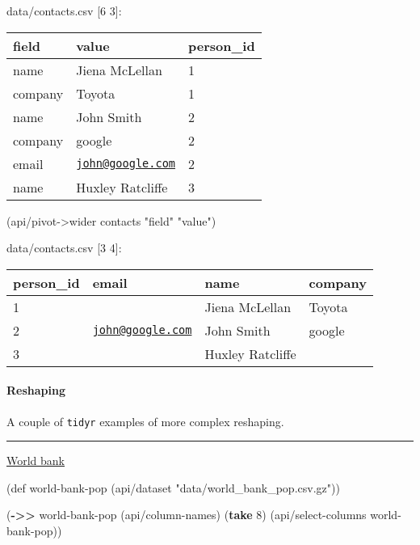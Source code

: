\documentclass[]{article}
\newenvironment{Shaded}{\begin{snugshade}}{\end{snugshade}}
\newcommand{\KeywordTok}[1]{\textcolor[rgb]{0.13,0.29,0.53}{\textbf{#1}}}
\newcommand{\DecValTok}[1]{\textcolor[rgb]{0.00,0.00,0.81}{#1}}
\newcommand{\StringTok}[1]{\textcolor[rgb]{0.31,0.60,0.02}{#1}}
\newcommand{\FunctionTok}[1]{\textcolor[rgb]{0.00,0.00,0.00}{#1}}
\newcommand{\BuiltInTok}[1]{#1}
\newcommand{\NormalTok}[1]{#1}
\let\oldparagraph\paragraph
\renewcommand{\paragraph}[1]{\oldparagraph{#1}\mbox{}}
\begin{document}
data/contacts.csv {[}6 3{]}:

\begin{longtable}[]{@{}lll@{}}
\toprule
field & value & person\_id\tabularnewline
\midrule
\endhead
name & Jiena McLellan & 1\tabularnewline
company & Toyota & 1\tabularnewline
name & John Smith & 2\tabularnewline
company & google & 2\tabularnewline
email & \href{mailto:john@google.com}{\nolinkurl{john@google.com}} &
2\tabularnewline
name & Huxley Ratcliffe & 3\tabularnewline
\bottomrule
\end{longtable}

\begin{Shaded}
\begin{Highlighting}[]
\NormalTok{(api/pivot->wider contacts }\StringTok{"field"} \StringTok{"value"}\NormalTok{)}
\end{Highlighting}
\end{Shaded}

data/contacts.csv {[}3 4{]}:

\begin{longtable}[]{@{}llll@{}}
\toprule
person\_id & email & name & company\tabularnewline
\midrule
\endhead
1 & & Jiena McLellan & Toyota\tabularnewline
2 & \href{mailto:john@google.com}{\nolinkurl{john@google.com}} & John
Smith & google\tabularnewline
3 & & Huxley Ratcliffe &\tabularnewline
\bottomrule
\end{longtable}

\paragraph{Reshaping}\label{reshaping}

A couple of \texttt{tidyr} examples of more complex reshaping.

\begin{center}\rule{0.5\linewidth}{0.5pt}\end{center}

\href{https://tidyr.tidyverse.org/articles/pivot.html\#world-bank}{World
bank}

\begin{Shaded}
\begin{Highlighting}[]
\NormalTok{(}\BuiltInTok{def}\FunctionTok{ world-bank-pop }\NormalTok{(api/dataset }\StringTok{"data/world_bank_pop.csv.gz"}\NormalTok{))}
\end{Highlighting}
\end{Shaded}

\begin{Shaded}
\begin{Highlighting}[]
\NormalTok{(}\KeywordTok{->>}\NormalTok{ world-bank-pop}
\NormalTok{     (api/column-names)}
\NormalTok{     (}\KeywordTok{take} \DecValTok{8}\NormalTok{)}
\NormalTok{     (api/select-columns world-bank-pop))}
\end{Highlighting}
\end{Shaded}
\end{document}
